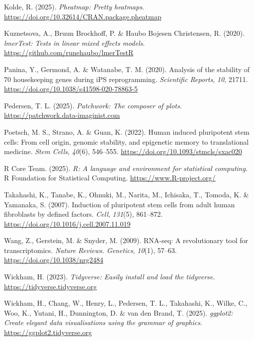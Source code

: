 \documentclass[
  letterpaper,
  DIV=11,
  numbers=noendperiod]{scrartcl}
\newlength{\cslhangindent}
\newenvironment{CSLReferences}[2] %
 {\begin{list}{}{%
  \setlength{\itemindent}{0pt}
  \setlength{\leftmargin}{0pt}
  \setlength{\parsep}{0pt}
  \ifodd #1
   \setlength{\leftmargin}{\cslhangindent}
   \setlength{\itemindent}{-1\cslhangindent}
  \fi
  \setlength{\itemsep}{#2\baselineskip}}}
 {\end{list}}
\begin{document}
\begin{CSLReferences}{1}{0}
Kolde, R. (2025). \emph{Pheatmap: Pretty heatmaps}.
\url{https://doi.org/10.32614/CRAN.package.pheatmap}

Kuznetsova, A., Bruun Brockhoff, P. \& Haubo Bojesen Christensen, R.
(2020). \emph{lmerTest: Tests in linear mixed effects models}.
\url{https://github.com/runehaubo/lmerTestR}

Panina, Y., Germond, A. \& Watanabe, T. M. (2020). Analysis of the
stability of 70 housekeeping genes during iPS reprogramming.
\emph{Scientific Reports}, \emph{10}, 21711.
\url{https://doi.org/10.1038/s41598-020-78863-5}

Pedersen, T. L. (2025). \emph{Patchwork: The composer of plots}.
\url{https://patchwork.data-imaginist.com}

Poetsch, M. S., Strano, A. \& Guan, K. (2022). Human induced pluripotent
stem cells: From cell origin, genomic stability, and epigenetic memory
to translational medicine. \emph{Stem Cells}, \emph{40}(6), 546--555.
\url{https://doi.org/10.1093/stmcls/sxac020}

R Core Team. (2025). \emph{R: A language and environment for statistical
computing}. R Foundation for Statistical Computing.
\url{https://www.R-project.org/}

Takahashi, K., Tanabe, K., Ohnuki, M., Narita, M., Ichisaka, T., Tomoda,
K. \& Yamanaka, S. (2007). Induction of pluripotent stem cells from
adult human fibroblasts by defined factors. \emph{Cell}, \emph{131}(5),
861--872. \url{https://doi.org/10.1016/j.cell.2007.11.019}

Wang, Z., Gerstein, M. \& Snyder, M. (2009). RNA-seq: A revolutionary
tool for transcriptomics. \emph{Nature Reviews. Genetics}, \emph{10}(1),
57--63. \url{https://doi.org/10.1038/nrg2484}

Wickham, H. (2023). \emph{Tidyverse: Easily install and load the
tidyverse}. \url{https://tidyverse.tidyverse.org}

Wickham, H., Chang, W., Henry, L., Pedersen, T. L., Takahashi, K.,
Wilke, C., Woo, K., Yutani, H., Dunnington, D. \& van den Brand, T.
(2025). \emph{ggplot2: Create elegant data visualisations using the
grammar of graphics}. \url{https://ggplot2.tidyverse.org}


\end{CSLReferences}
\end{document}
